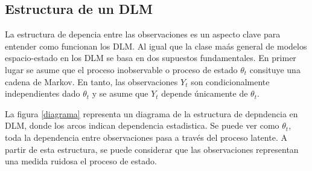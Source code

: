 \documentclass[12pt]{article}\usepackage[]{graphicx}\usepackage[]{color}
\begin{document}
\subsection{Estructura de un DLM}

La estructura de depencia entre las observaciones es un aspecto clave para entender como funcionan los DLM. Al igual que la clase maás general de modelos espacio-estado en los DLM se basa en dos supuestos fundamentales. En primer lugar se asume  que el proceso inobservable o proceso de estado $\theta_t$ consituye una cadena de Markov.  En tanto, las observaciones $Y_t$ son condicionalmente independientes dado $\theta_t$ y se asume que $Y_t$ depende únicamente de $\theta_t$. 

\begin{center}
\label{diagrama}
\end{center}

La figura \ref{diagrama} representa un diagrama de la estructura de depndencia en DLM, donde los arcos indican dependencia estadistica. Se puede ver como  $\theta_t$, toda la dependencia entre observaciones pasa a través del proceso latente. A partir de esta estructura, se puede considerar que las observaciones representan una medida ruidosa el proceso de estado.
\end{document}
